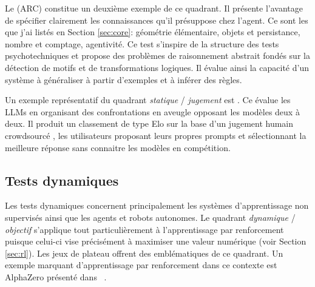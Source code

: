 Le  (ARC) \cite{chollet_measure_2019} constitue un deuxième exemple de ce quadrant.
Il présente l'avantage de spécifier clairement les connaissances qu'il présuppose chez l'agent. 
Ce sont les  que j'ai listés en Section \ref{sec:core}: géométrie élémentaire, objets et persistance, nombre et comptage, agentivité.
Ce test s’inspire de la structure des tests psychotechniques et propose des problèmes de raisonnement abstrait fondés sur la détection de motifs et de transformations logiques. 
Il évalue ainsi la capacité d’un système à généraliser à partir d’exemples et à inférer des règles.




Un exemple représentatif du quadrant \emph{statique} / \emph{jugement} est  \cite{chiang_chatbot_2024}.
Ce  évalue les LLMs en organisant des confrontations en aveugle opposant les modèles deux à deux.
Il produit un classement de type Elo sur la base d'un jugement humain \og crowdsourcé \fg, les utilisateurs proposant leurs propres prompts et sélectionnant la meilleure réponse sans connaitre les modèles en compétition. 

\subsection{Tests dynamiques}

\noindent
Les tests dynamiques concernent principalement les systèmes d'apprentissage non supervisés ainsi que les agents et robots autonomes. 
Le quadrant \emph{dynamique} / \emph{objectif} s'applique tout particulièrement à l'apprentissage par renforcement puisque celui-ci vise précisément à maximiser une valeur numérique (voir Section \ref{sec:rl}). 
Les jeux de plateau offrent des  emblématiques de ce quadrant. 
Un exemple marquant d'apprentissage par renforcement dans ce contexte est AlphaZero présenté dans \og {} \fg\ \cite{silver_general_2018}.

